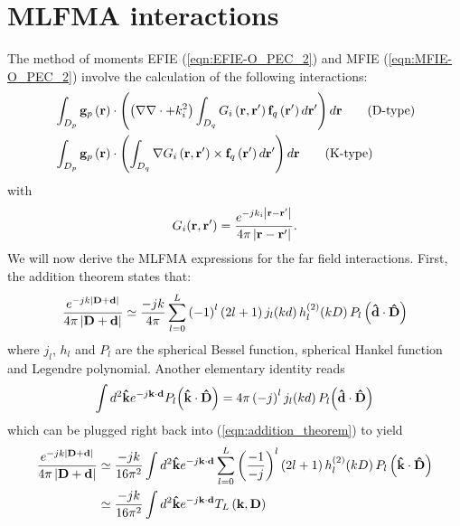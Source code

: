 \chapter{MLFMA interactions}
%
\par
The method of moments EFIE (\ref{eqn:EFIE-O_PEC_2}) and MFIE (\ref{eqn:MFIE-O_PEC_2}) involve the calculation of the following interactions:
\begin{align}
& \int_{D_p} \mathbf{g}_p\left(\mathbf{r}\right) \cdot \left(\left(\nabla \nabla \cdot + k_i^2\right) \int_{D_q} G_i\left(\mathbf{r}, \mathbf{r}'\right) \mathbf{f}_q\left(\mathbf{r}'\right) d\mathbf{r}' \right) d\mathbf{r} \qquad \text{(D-type)} \label{eqn:interaction_D}\\
& \int_{D_p} \mathbf{g}_p\left(\mathbf{r}\right) \cdot \left( \int_{D_q} \nabla G_i\left(\mathbf{r}, \mathbf{r}'\right) \times \mathbf{f}_q\left(\mathbf{r}'\right) d\mathbf{r}' \right) d\mathbf{r} \qquad \text{(K-type)} \label{eqn:interaction_K}
\end{align}
with
\begin{equation*}
G_i(\mathbf{r}, \mathbf{r}') = \frac{e^{-jk_i \left|\mathbf{r} - \mathbf{r}'  \right|}}{4 \pi \left|\mathbf{r} - \mathbf{r}'  \right|}.
\end{equation*}
We will now derive the MLFMA expressions for the far field interactions. First, the addition theorem states that:
\begin{equation}\label{eqn:addition_theorem}
\frac{e^{-jk \left|\mathbf{D} + \mathbf{d}  \right|}}{4 \pi \left|\mathbf{D} + \mathbf{d} \right|} \simeq \frac{-jk}{4 \pi} \sum_{l = 0}^L \left(-1\right)^l \left(2l+1 \right) j_l \! \left(k d\right) h_l^{(2)}\! \left(k D\right) P_l\left(\mathbf{\hat{d}} \cdot \mathbf{\hat{D}} \right)
\end{equation}
where $j_l$, $h_l$ and $P_l$ are the spherical Bessel function, spherical Hankel function and Legendre polynomial. Another elementary identity reads
\begin{equation}
\int d^2\mathbf{\hat{k}} e^{-j\mathbf{k} \cdot \mathbf{d}} P_l \! \left(\mathbf{\hat{k}} \cdot \mathbf{\hat{D}}\right) = 4 \pi \left(-j \right)^l j_l \! \left(k d\right) P_l \! \left(\mathbf{\hat{d}} \cdot \mathbf{\hat{D}}\right)
\end{equation}
which can be plugged right back into (\ref{eqn:addition_theorem}) to yield
\begin{equation}\label{eqn:addition_theorem_2}
\begin{split}
\frac{e^{-jk \left|\mathbf{D} + \mathbf{d}  \right|}}{4 \pi \left|\mathbf{D} + \mathbf{d} \right|} &\simeq \frac{-jk}{16 \pi^2} \int d^2\mathbf{\hat{k}} e^{-j\mathbf{k} \cdot \mathbf{d}} \sum_{l = 0}^L \left(\frac{-1}{-j}\right)^l \left(2l+1 \right) h_l^{(2)}\! \left(k D\right) P_l\left(\mathbf{\hat{k}} \cdot \mathbf{\hat{D}} \right) \\
&\simeq \frac{-jk}{16 \pi^2} \int d^2\mathbf{\hat{k}} e^{-j\mathbf{k} \cdot \mathbf{d}} T_L\left(\mathbf{k}, \mathbf{D} \right)
\end{split}
\end{equation}
